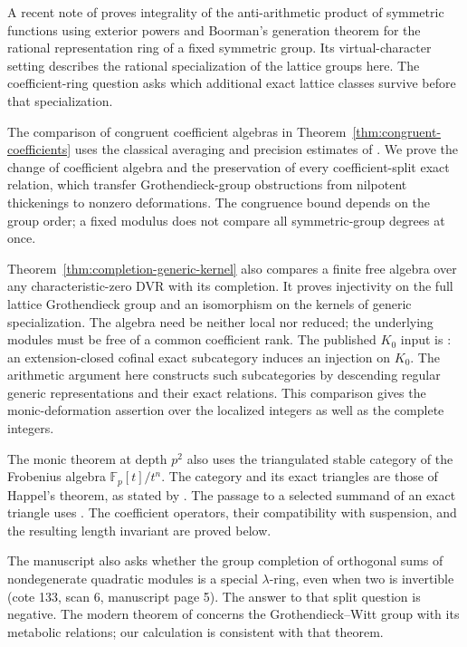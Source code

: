 \documentclass[11pt,a4paper]{article}
\theoremstyle{definition}\newtheorem{definition}[theorem]{Definition}
\theoremstyle{remark}\newtheorem{remark}[theorem]{Remark}
\begin{document}
A recent note of \citet[Theorem~1.2(c), p.~4, and
Section~3.2, p.~12]{GPT6Grinberg2026} proves integrality of the
anti-arithmetic product of symmetric functions using exterior powers
and Boorman's generation theorem for the rational representation
ring of a fixed symmetric group.  Its virtual-character setting
describes the rational specialization of the lattice groups here.
The coefficient-ring question asks which additional exact lattice
classes survive before that specialization.

The comparison of congruent coefficient algebras in
Theorem~\ref{thm:congruent-coefficients} uses the classical
averaging and precision estimates of
\citet[Theorems~2--3, pp.~347--351]{Maranda1953}.
We prove the change of coefficient algebra and the preservation
of every coefficient-split exact relation, which transfer
Grothendieck-group obstructions from nilpotent thickenings to
nonzero deformations.  The congruence bound depends on the group
order; a fixed modulus does not compare all symmetric-group
degrees at once.

Theorem~\ref{thm:completion-generic-kernel} also compares a finite
free algebra over any characteristic-zero DVR with its completion.  It proves injectivity
on the full lattice Grothendieck group and an isomorphism on the
kernels of generic specialization.  The algebra need be neither
local nor reduced; the underlying modules must be free of a common
coefficient rank.  The published $K_0$ input is
\citet[Chapter~II, Lemma~7.2, p.~62 of the author chapter version]{Weibel2013}:
an extension-closed cofinal exact subcategory induces an injection
on $K_0$.  The arithmetic argument here constructs such subcategories
by descending regular generic representations and their exact relations.
This comparison gives the monic-deformation assertion over the
localized integers as well as the complete integers.

The monic theorem at depth $p^2$ also uses the triangulated
stable category of the Frobenius algebra $\mathbb F_p[t]/t^n$.
The category and its exact triangles are those of Happel's theorem,
as stated by \citet[Section~13.4, Theorem~13.7, author p.~50]{Buhler2010}.
The passage to a selected summand of an exact triangle uses
\citet[Lemma~1.6, pp.~821--822]{BalmerSchlichting2001}.
The coefficient operators, their compatibility with suspension,
and the resulting length invariant are proved below.

The manuscript also asks whether the group completion of orthogonal
sums of nondegenerate quadratic modules is a special $\lambda$-ring,
even when two is invertible (cote 133, scan 6, manuscript page 5).
The answer to that split question is negative.  The modern theorem
of \citet[main theorem, p.~1056; Definition~1.2, p.~1060]{Zibrowius2015}
concerns the Grothendieck--Witt group with its metabolic relations;
our calculation is consistent with that theorem.
\end{document}
